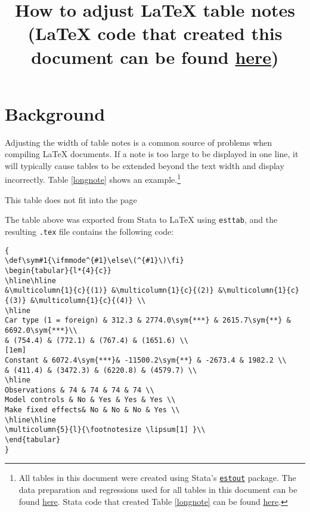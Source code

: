 \documentclass[11pt,a4paper]{article}
\title{How to adjust LaTeX table notes \\  \large ({\LaTeX} code that created this document can be found \href{https://github.com/bbdaniels/stata-tables/blob/latex-tables-resources/outputs/table_notes.tex}{here})}
\def\sym#1{\ifmmode^{#1}\else\(^{#1}\)\fi}
\begin{document}
\maketitle
\section{Background}

Adjusting the width of table notes is a common source of problems when compiling {\LaTeX} documents. If a note is too large to be displayed in one line, it will typically cause tables to be extended beyond the text width and display incorrectly. Table \ref{longnote} shows an example.\footnote{All tables in this document were created using Stata's \href{http://repec.sowi.unibe.ch/stata/estout/}{\texttt{estout}} package. The data preparation and regressions used for all tables in this document can be found \href{https://gist.github.com/luizaandrade/778253b98a9c22b62e3cb07bc3655fbc}{here}. Stata code that created Table \ref{longnote} can be found \href{https://gist.github.com/luizaandrade/83bc1bae403a50616c82dd33c54b57b3}{here}. }

\begin{table}[H]
	\caption{This table does not fit into the page}
	\label{longnote}
	
\end{table}

The table above was exported from Stata to {\LaTeX} using \texttt{esttab}, and the resulting \texttt{.tex} file contains the following code:

\begin{samepage}
	\scriptsize
	\begin{verbatim}
{
\def\sym#1{\ifmmode^{#1}\else\(^{#1}\)\fi}
\begin{tabular}{l*{4}{c}}
\hline\hline
&\multicolumn{1}{c}{(1)} &\multicolumn{1}{c}{(2)} &\multicolumn{1}{c}{(3)} &\multicolumn{1}{c}{(4)} \\
\hline
Car type (1 = foreign) & 312.3 & 2774.0\sym{***} & 2615.7\sym{**} & 6692.0\sym{***}\\
& (754.4) & (772.1) & (767.4) & (1651.6) \\
[1em]
Constant & 6072.4\sym{***}& -11500.2\sym{**} & -2673.4 & 1982.2 \\
& (411.4) & (3472.3) & (6220.8) & (4579.7) \\
\hline
Observations & 74 & 74 & 74 & 74 \\
Model controls & No & Yes & Yes & Yes \\
Make fixed effects& No & No & No & Yes \\
\hline\hline 
\multicolumn{5}{l}{\footnotesize \lipsum[1] }\\ 
\end{tabular}
}
	\end{verbatim}
\end{samepage}
\end{document}

